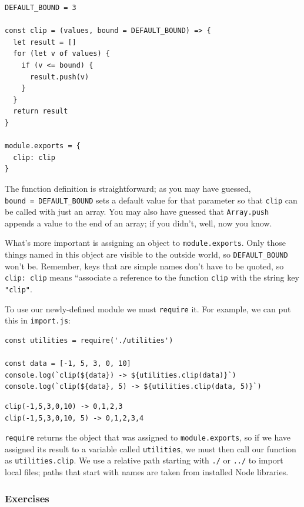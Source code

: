 \begin{verbatim}
DEFAULT_BOUND = 3

const clip = (values, bound = DEFAULT_BOUND) => {
  let result = []
  for (let v of values) {
    if (v <= bound) {
      result.push(v)
    }
  }
  return result
}

module.exports = {
  clip: clip
}
\end{verbatim}

The function definition is straightforward; as you may have guessed,
\texttt{bound\ =\ DEFAULT\_BOUND} sets a default value for that
parameter so that \texttt{clip} can be called with just an array. You
may also have guessed that \texttt{Array.push} appends a value to the
end of an array; if you didn't, well, now you know.

What's more important is assigning an object to \texttt{module.exports}.
Only those things named in this object are visible to the outside world,
so \texttt{DEFAULT\_BOUND} won't be. Remember, keys that are simple
names don't have to be quoted, so \texttt{clip:\ clip} means ``associate
a reference to the function \texttt{clip} with the string key
\texttt{"clip"}.

To use our newly-defined module we must \texttt{require} it. For
example, we can put this in \texttt{import.js}:

\begin{verbatim}
const utilities = require('./utilities')

const data = [-1, 5, 3, 0, 10]
console.log(`clip(${data}) -> ${utilities.clip(data)}`)
console.log(`clip(${data}, 5) -> ${utilities.clip(data, 5)}`)
\end{verbatim}

\begin{verbatim}
clip(-1,5,3,0,10) -> 0,1,2,3
clip(-1,5,3,0,10, 5) -> 0,1,2,3,4
\end{verbatim}

\texttt{require} returns the object that was assigned to
\texttt{module.exports}, so if we have assigned its result to a variable
called \texttt{utilities}, we must then call our function as
\texttt{utilities.clip}. We use a relative path starting with
\texttt{./} or \texttt{../} to import local files; paths that start with
names are taken from installed Node libraries.

\subsubsection{Exercises}\label{s:basics-exercises}

